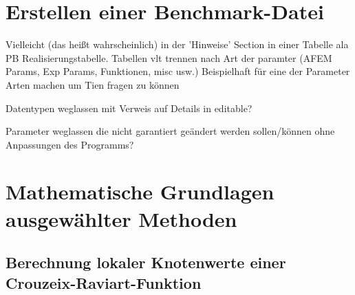 \section{Erstellen einer Benchmark-Datei}
Vielleicht (das heißt wahrscheinlich) in der 'Hinweise' Section in einer
Tabelle ala PB Realisierungstabelle. Tabellen vlt trennen nach Art der paramter
(AFEM Params, Exp Params, Funktionen, misc usw.)
Beispielhaft für eine der Parameter Arten machen um Tien fragen zu können

Datentypen weglassen mit Verweis auf Details in editable?

Parameter weglassen die nicht garantiert geändert werden sollen/können ohne
Anpassungen des Programms?

\section{Mathematische Grundlagen ausgewählter Methoden}
\label{sec:mathematicalBasicsForMethods}


\subsection{Berechnung lokaler Knotenwerte einer Crouzeix-Raviart-Funktion}

